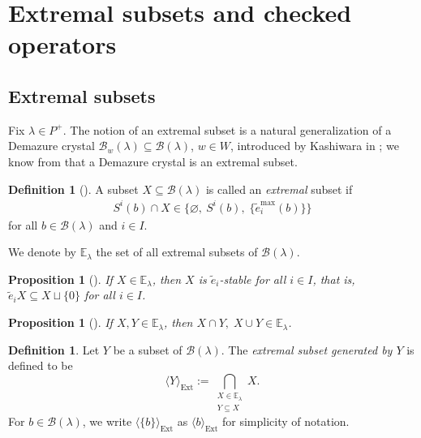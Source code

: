 \documentclass[reqno]{amsart}
\newtheorem{proposition}[theorem]{Proposition}
\theoremstyle{definition}
\newtheorem{definition}[theorem]{Definition}
\theoremstyle{remark}
\numberwithin{equation}{section}
\newcommand{\B}{\mathcal{B}}
\newcommand{\Ext}{\operatorname{Ext}}
\newcommand{\te}{\tilde e}
\newcommand{\Bl}{\B(\lambda)}
\begin{document}
	\section{Extremal subsets and checked operators}\label{sec:extremal-subsets}
	
	\subsection{Extremal subsets}\label{subsec:extremal-crystals}
	Fix $\lambda\in P^+$.
	The notion of an extremal subset is a natural
	generalization of a Demazure crystal
	$\B_w(\lambda)\subseteq\Bl$, $w\in W$,
	introduced by Kashiwara in \cite{kashiwara1993};
    we know from \cite[Proposition 3.3.5]{kashiwara1993} that a Demazure crystal is an extremal subset.
	
	\begin{definition}[{\cite[\S 4]{assaf2023}}]\label{def:extremal-recall}
		A subset $X\subseteq\Bl$ is called an \emph{extremal} subset 
		if
		\begin{align}\label{i-stringproperty}
			S^i(b)\cap X\in\{\varnothing,\ S^i(b),\;\{\te_i^{\max}(b)\}\}
		\end{align}
		for all $b\in\Bl$ and $i\in I$.
	\end{definition}
	
	
	We denote by $\mathbb{E}_\lambda$ the set of all extremal subsets of $\Bl$.
	
	\begin{proposition}[{\cite[\S 4]{assaf2023}}]\label{prop:ext-e-stable}
		If $X\in\mathbb{E}_\lambda$, then $X$ is $\te_i$-stable for all $i\in I$,
		that is, $\te_iX\subseteq X\sqcup\{0\}$ for all $i\in I$.
	\end{proposition}
	
	\begin{proposition}[{\cite[Lemma 4.1]{armon2023}}]\label{prop:cup-cap-extremal}
		If $X,Y\in\mathbb{E}_\lambda$, then $X\cap Y,\;X\cup Y\in\mathbb{E}_\lambda$.
	\end{proposition}
	
	\begin{definition}\label{def:ext-generated}
		Let $Y$ be a subset of $\Bl$.
		The \emph{extremal subset generated by $Y$} is defined to be
		\[
		\langle Y\rangle_{\Ext}:=\bigcap_{\substack{X\in\mathbb{E}_\lambda\\Y\subseteq X}}X.
		\]
		For $b\in\Bl$,
		we write $\langle\{b\}\rangle_{\Ext}$ as $\langle b\rangle_{\Ext}$ for simplicity of notation.
	\end{definition}
	
\end{document}
